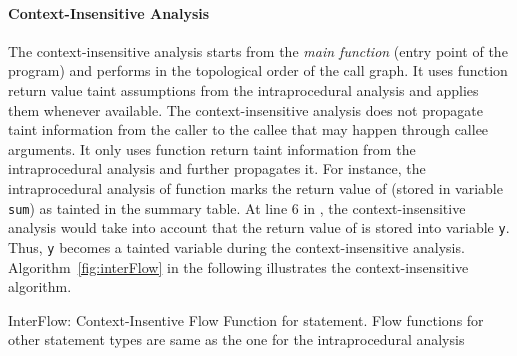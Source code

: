 \paragraph{Context-Insensitive Analysis}
The context-insensitive analysis starts from the \textit{main function}
(entry point of the program) and performs in the topological order
of the call graph. It uses function return value taint assumptions
from the intraprocedural analysis and applies them whenever available.
The context-insensitive analysis does not propagate taint information
from the caller to the callee that may happen through callee arguments.
It only uses function return taint information from the intraprocedural
analysis  and further propagates it.
For instance, the intraprocedural analysis of function \main{}
marks the return value of \compute (stored in variable \texttt{sum})
as tainted in the summary table. At line $6$ in \main, the context-insensitive
analysis  would take into account that the return value of \compute is
stored into variable \texttt{y}. Thus, \texttt{y} becomes a
tainted variable during the context-insensitive analysis.
Algorithm~\ref{fig:interFlow} in the following
illustrates the context-insensitive algorithm.
\IncMargin{1em}
\begin{algorithm}[!htbp]
\caption{InterFlow: Context-Insentive Flow Function for \callt
statement. Flow functions for other statement types are same
as the one for the intraprocedural analysis}\label{fig:interFlow}
\LinesNumbered
\DontPrintSemicolon
{}

\OutData{}
\end{algorithm}
\DecMargin{1em}

